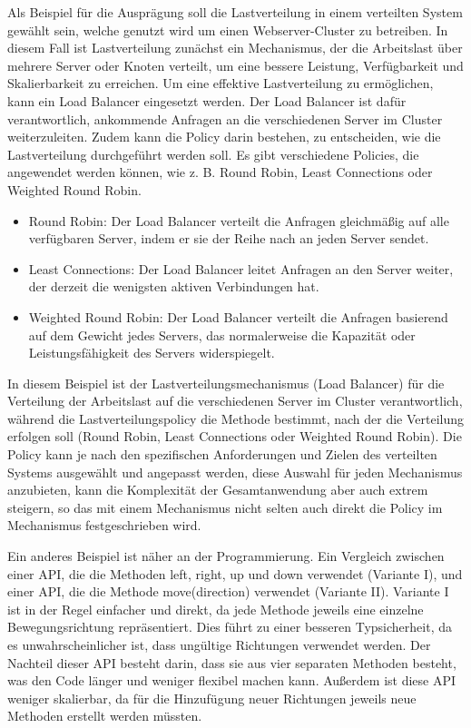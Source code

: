 \documentclass[../vs-script-first-v01.tex]{subfiles}
\begin{document}
Als Beispiel für die Ausprägung soll die Lastverteilung in einem verteilten System gewählt sein, welche genutzt wird um einen  Webserver-Cluster zu betreiben. In diesem Fall ist Lastverteilung zunächst ein Mechanismus, der die Arbeitslast über mehrere Server oder Knoten verteilt, um eine bessere Leistung, Verfügbarkeit und Skalierbarkeit zu erreichen. Um eine effektive Lastverteilung zu ermöglichen, kann ein Load Balancer eingesetzt werden. Der Load Balancer ist dafür verantwortlich, ankommende Anfragen an die verschiedenen Server im Cluster weiterzuleiten.
Zudem kann die Policy darin bestehen, zu entscheiden, wie die Lastverteilung durchgeführt werden soll. Es gibt verschiedene Policies, die angewendet werden können, wie z. B. Round Robin, Least Connections oder Weighted Round Robin.
\begin{itemize} 
\item Round Robin: Der Load Balancer verteilt die Anfragen gleichmäßig auf alle verfügbaren Server, indem er sie der Reihe nach an jeden Server sendet.
\item Least Connections: Der Load Balancer leitet Anfragen an den Server weiter, der derzeit die wenigsten aktiven Verbindungen hat.
\item Weighted Round Robin: Der Load Balancer verteilt die Anfragen basierend auf dem Gewicht jedes Servers, das normalerweise die Kapazität oder Leistungsfähigkeit des Servers widerspiegelt.
\end{itemize}  
In diesem Beispiel ist der Lastverteilungsmechanismus (Load Balancer) für die Verteilung der Arbeitslast auf die verschiedenen Server im Cluster verantwortlich, während die Lastverteilungspolicy die Methode bestimmt, nach der die Verteilung erfolgen soll (Round Robin, Least Connections oder Weighted Round Robin). Die Policy kann je nach den spezifischen Anforderungen und Zielen des verteilten Systems ausgewählt und angepasst werden, diese Auswahl für jeden Mechanismus anzubieten, kann die Komplexität der Gesamtanwendung aber auch extrem steigern, so das mit einem Mechanismus nicht selten auch direkt die Policy im Mechanismus festgeschrieben wird.  

Ein anderes Beispiel ist näher an der Programmierung. Ein Vergleich zwischen einer API, die die Methoden left, right, up und down verwendet (Variante I), und einer API, die die Methode move(direction) verwendet (Variante II). Variante I ist in der Regel einfacher und direkt, da jede Methode jeweils eine einzelne Bewegungsrichtung repräsentiert. Dies führt zu einer besseren Typsicherheit, da es unwahrscheinlicher ist, dass ungültige Richtungen verwendet werden. Der Nachteil dieser API besteht darin, dass sie aus vier separaten Methoden besteht, was den Code länger und weniger flexibel machen kann. Außerdem ist diese API weniger skalierbar, da für die Hinzufügung neuer Richtungen jeweils neue Methoden erstellt werden müssten.
\end{document}

